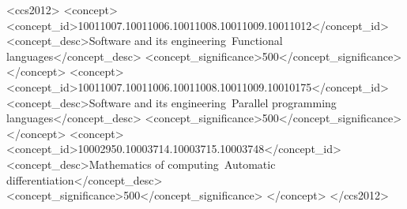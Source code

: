 \documentclass[acmsmall,screen,nonacm]{acmart}
\begin{document}
%
\begin{abstract}
We present a novel programming language design that attempts to combine the clarity and safety of high-level functional languages with the efficiency and parallelism of low-level numerical languages.
We treat arrays as eagerly-memoized functions on typed index sets, allowing abstract function manipulations, such as currying, to work on arrays.
In contrast to composing primitive bulk-array operations, we argue for an explicit nested indexing style that mirrors application of functions to arguments.
We also introduce a fine-grained typed effects system which affords concise and automatically-parallelized in-place updates.  Specifically, an associative accumulation effect allows reverse-mode automatic differentiation of in-place updates in a way that preserves parallelism.
Empirically, we benchmark against the Futhark array programming language, and demonstrate that aggressive inlining and type-driven compilation allows array programs to be written in an expressive, ``pointful'' style with little performance penalty.
\end{abstract}

\begin{CCSXML}
<ccs2012>
   <concept>
       <concept_id>10011007.10011006.10011008.10011009.10011012</concept_id>
       <concept_desc>Software and its engineering~Functional languages</concept_desc>
       <concept_significance>500</concept_significance>
       </concept>
   <concept>
       <concept_id>10011007.10011006.10011008.10011009.10010175</concept_id>
       <concept_desc>Software and its engineering~Parallel programming languages</concept_desc>
       <concept_significance>500</concept_significance>
       </concept>
   <concept>
       <concept_id>10002950.10003714.10003715.10003748</concept_id>
       <concept_desc>Mathematics of computing~Automatic differentiation</concept_desc>
       <concept_significance>500</concept_significance>
       </concept>
 </ccs2012>
\end{CCSXML}

\end{document}
